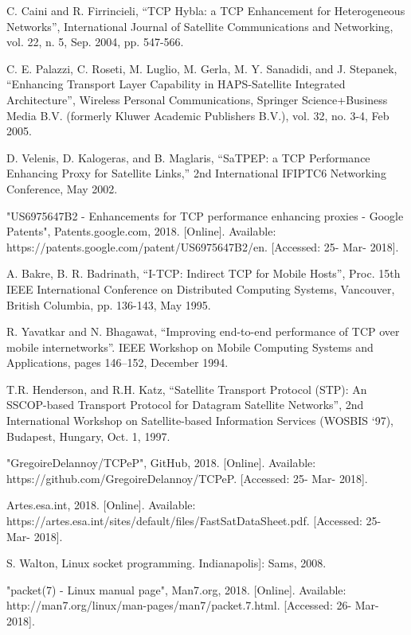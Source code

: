  C. Caini and R. Firrincieli, “TCP Hybla: a TCP Enhancement for Heterogeneous Networks”, International Journal of Satellite Communications and Networking, vol. 22, n. 5, Sep. 2004, pp. 547-566.

 C. E. Palazzi, C. Roseti, M. Luglio, M. Gerla, M. Y. Sanadidi, and J. Stepanek, “Enhancing Transport Layer Capability in HAPS-Satellite Integrated Architecture”, Wireless Personal Communications, Springer Science+Business Media B.V. (formerly Kluwer Academic Publishers B.V.), vol. 32, no. 3-4, Feb 2005. 

 D. Velenis, D. Kalogeras, and B. Maglaris, “SaTPEP: a TCP Performance Enhancing Proxy for Satellite Links,” 2nd International IFIPTC6 Networking Conference, May 2002. 

 "US6975647B2 - Enhancements for TCP performance enhancing proxies - Google Patents", Patents.google.com, 2018. [Online]. Available: https://patents.google.com/patent/US6975647B2/en. [Accessed: 25- Mar- 2018].

 A. Bakre, B. R. Badrinath, “I-TCP: Indirect TCP for Mobile Hosts”, Proc. 15th IEEE International Conference on Distributed Computing Systems, Vancouver, British Columbia, pp. 136-143, May 1995. 

 R. Yavatkar and N. Bhagawat, “Improving end-to-end performance of TCP over mobile internetworks”. IEEE Workshop on Mobile Computing Systems and Applications, pages 146--152, December 1994. 

 T.R. Henderson, and R.H. Katz, “Satellite Transport Protocol (STP): An SSCOP-based Transport Protocol for Datagram Satellite Networks”, 2nd International Workshop on Satellite-based Information Services (WOSBIS `97), Budapest, Hungary, Oct. 1, 1997. 

 "GregoireDelannoy/TCPeP", GitHub, 2018. [Online]. Available: https://github.com/GregoireDelannoy/TCPeP. [Accessed: 25- Mar- 2018]. 

 Artes.esa.int, 2018. [Online]. Available: https://artes.esa.int/sites/default/files/FastSatDataSheet.pdf. [Accessed: 25- Mar- 2018]. 

 S. Walton, Linux socket programming. Indianapolis]: Sams, 2008. 

 "packet(7) - Linux manual page", Man7.org, 2018. [Online]. Available: http://man7.org/linux/man-pages/man7/packet.7.html. [Accessed: 26- Mar- 2018]. 

